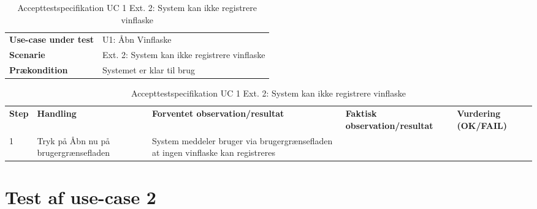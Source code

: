 \begin{table}[H]
	\centering
	\caption{Accepttestspecifikation UC 1 Ext. 2: System kan ikke registrere vinflaske}
	\label{ATUC1:Ext2}
	\begin{tabular}{ p{80pt}  p{320pt} }\hline
		\rowcolor{white}	
		\textbf{Use-case under test} & U1: Åbn Vinflaske \\
		\rowcolor{lightgray}
		\textbf{Scenarie} & Ext. 2: System kan ikke registrere vinflaske \\\rowcolor{white}	
		\textbf{Prækondition} &
		Systemet er klar til brug \\
		\hline
	\end{tabular}
	\begin{tabular}{  p{26pt} p{100pt}  p{101pt} | p{67pt} | p{68pt}}
		\textbf{Step} & \textbf{Handling} & \textbf{Forventet observation/resultat} & \textbf{Faktisk observation/resultat} & \textbf{Vurdering (OK/FAIL)}\\
		1 & Tryk på Åbn nu på
		brugergrænsefladen & System meddeler bruger
		via brugergrænsefladen
		at ingen vinflaske kan
		registreres &  &  \\
		\hline
	\end{tabular}
\end{table}

\section{Test af use-case 2}

